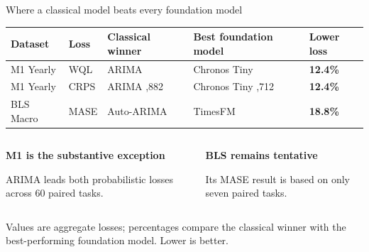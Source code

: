 \documentclass[aspectratio=169,10pt]{beamer}
\newcommand{\tagbox}[2]{%
  \tikz[baseline=(tag.base)]{%
    \node[fill=#1,rounded corners=1.5pt,inner xsep=4pt,inner ysep=3pt]
      (tag) {\strut #2};
  }%
}
\begin{document}
\begin{frame}{Where a classical model beats every foundation model}
  \vspace{0.06cm}
  \begin{center}
    \tagbox{GoldLight}{\large\textbf{3 of 36 cells}}
  \end{center}

  \vspace{0.22cm}
  \begin{center}
    \fontsize{8.4}{9.8}\selectfont
    \renewcommand{\arraystretch}{1.36}
    \setlength{\tabcolsep}{5pt}
    \begin{tabular}{L{2.45cm} C{1.25cm} L{3.10cm} L{3.10cm} C{1.65cm}}
      \toprule
      \textbf{Dataset} & \textbf{Loss} & \textbf{Classical winner} &
        \textbf{Best foundation model} & \textbf{Lower loss} \\
      \midrule
      M1 Yearly & WQL & ARIMA  & Chronos Tiny  & \textbf{12.4\%} \\
       M1 Yearly & CRPS & ARIMA ,882 & Chronos Tiny ,712 & \textbf{12.4\%} \\
      BLS Macro & MASE & Auto-ARIMA  & TimesFM  & \textbf{18.8\%} \\
      \bottomrule
    \end{tabular}
  \end{center}

  \vspace{0.34cm}
  \begin{columns}[T,totalwidth=0.90\linewidth]
    \begin{column}{0.44\linewidth}
      \colorbox{GoldLight}{\parbox{0.91\linewidth}{\centering\small
        \textbf{M1 is the substantive exception}\par
        ARIMA leads both probabilistic losses across 60 paired tasks.}}
    \end{column}
    \begin{column}{0.44\linewidth}
      \colorbox{Paper}{\parbox{0.91\linewidth}{\centering\small
        \textbf{BLS remains tentative}\par
        Its MASE result is based on only seven paired tasks.}}
    \end{column}
  \end{columns}

  \vspace{0.16cm}
  \scriptsize\color{Muted}
  Values are aggregate losses; percentages compare the classical winner with
  the best-performing foundation model. Lower is better.
\end{frame}
\end{document}
